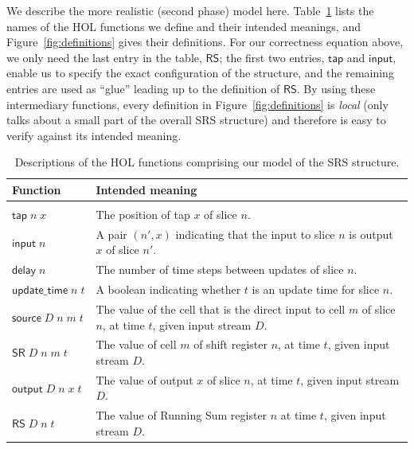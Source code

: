 \documentclass{llncs}
\begin{document}
We describe the more realistic (second phase) model here.
Table~\ref{tab:descriptions} lists the names of the HOL functions we define and their intended meanings, and Figure~\ref{fig:definitions} gives their definitions.
For our correctness equation above, we only need the last entry in the table, $\mathsf{RS}$; the first two entries, $\mathsf{tap}$ and $\mathsf{input}$, enable us to specify the exact configuration of the structure, and the remaining entries are used as ``glue'' leading up to the definition of $\mathsf{RS}$.
By using these intermediary functions, every definition in Figure~\ref{fig:definitions} is \emph{local} (only talks about a small part of the overall SRS structure) and therefore is easy to verify against its intended meaning.

\begin{table}
\caption{
Descriptions of the HOL functions comprising our model of the SRS structure.
\label{tab:descriptions}
}
\begin{tabular}{lp{}}
Function&Intended meaning\\
\hline\\
\(\mathsf{tap}\;n\;x\)&The position of tap $x$ of slice $n$.\\
\(\mathsf{input}\;n\)&A pair $(n',x)$ indicating that the input to slice $n$ is output $x$ of slice $n'$.\\
\(\mathsf{delay}\;n\)&The number of time steps between updates of slice $n$.\\
\(\mathsf{update\_time}\;n\;t\)&A boolean indicating whether $t$ is an update time for slice $n$.\\
\(\mathsf{source}\;D\;n\;m\;t\)&The value of the cell that is the direct input to cell $m$ of slice $n$, at time $t$, given input stream $D$.\\
\(\mathsf{SR}\;D\;n\;m\;t\)&The value of cell $m$ of shift register $n$, at time $t$, given input stream $D$.\\
\(\mathsf{output}\;D\;n\;x\;t\)&The value of output $x$ of slice $n$, at time $t$, given input stream $D$.\\
\(\mathsf{RS}\;D\;n\;t\)&The value of Running Sum register $n$ at time $t$, given input stream $D$.
\end{tabular}
\end{table}
\end{document}
